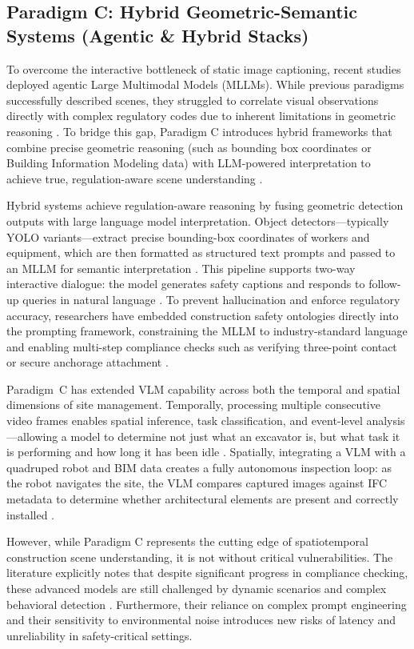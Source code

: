 \documentclass[10pt,letterpaper]{article}
\begin{document}
\subsection{Paradigm C: Hybrid Geometric-Semantic Systems (Agentic \& Hybrid Stacks)}

To overcome the interactive bottleneck of static image captioning, recent studies deployed agentic Large Multimodal Models (MLLMs). While previous paradigms successfully described scenes, they struggled to correlate visual observations directly with complex regulatory codes due to inherent limitations in geometric reasoning \cite{hussain2026}. To bridge this gap, Paradigm C introduces hybrid frameworks that combine precise geometric reasoning (such as bounding box coordinates or Building Information Modeling data) with LLM-powered interpretation to achieve true, regulation-aware scene understanding \cite{hussain2026}.

Hybrid systems achieve regulation-aware reasoning by fusing geometric detection outputs with large language model interpretation. Object detectors---typically YOLO variants---extract precise bounding-box coordinates of workers and equipment, which are then formatted as structured text prompts and passed to an MLLM for semantic interpretation \cite{hussain2026}. This pipeline supports two-way interactive dialogue: the model generates safety captions and responds to follow-up queries in natural language \cite{hussain2026}. To prevent hallucination and enforce regulatory accuracy, researchers have embedded construction safety ontologies directly into the prompting framework, constraining the MLLM to industry-standard language and enabling multi-step compliance checks such as verifying three-point contact or secure anchorage attachment \cite{chan2025}.

Paradigm~C has extended VLM capability across both the temporal and spatial dimensions of site management. Temporally, processing multiple consecutive video frames enables spatial inference, task classification, and event-level analysis---allowing a model to determine not just what an excavator is, but what task it is performing and how long it has been idle \cite{jeoung2025}. Spatially, integrating a VLM with a quadruped robot and BIM data creates a fully autonomous inspection loop: as the robot navigates the site, the VLM compares captured images against IFC metadata to determine whether architectural elements are present and correctly installed \cite{tuomisto2026}.

However, while Paradigm C represents the cutting edge of spatiotemporal construction scene understanding, it is not without critical vulnerabilities. The literature explicitly notes that despite significant progress in compliance checking, these advanced models are still challenged by dynamic scenarios and complex behavioral detection \cite{hussain2026}. Furthermore, their reliance on complex prompt engineering and their sensitivity to environmental noise introduces new risks of latency and unreliability in safety-critical settings.
\end{document}
